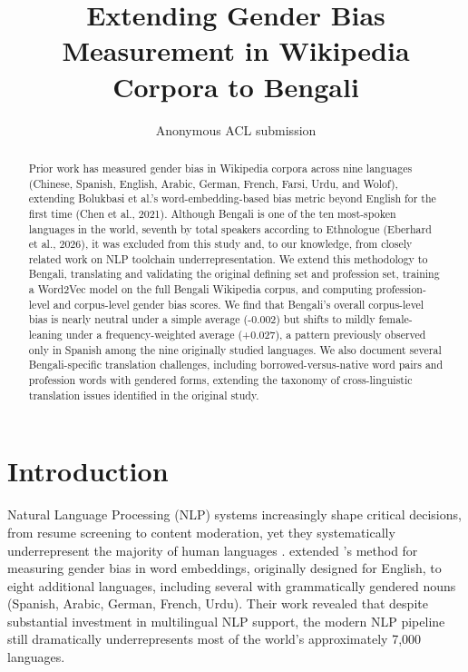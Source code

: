 \documentclass[11pt]{article}
\title{Extending Gender Bias Measurement in Wikipedia Corpora to Bengali}
\author{Anonymous ACL submission}
\begin{document}
\maketitle

\begin{abstract}
Prior work has measured gender bias in Wikipedia corpora across nine languages (Chinese, Spanish, English, Arabic, German, French, Farsi, Urdu, and Wolof), extending Bolukbasi et al.'s word-embedding-based bias metric beyond English for the first time (Chen et al., 2021). Although Bengali is one of the ten most-spoken languages in the world, seventh by total speakers according to Ethnologue (Eberhard et al., 2026), it was excluded from this study and, to our knowledge, from closely related work on NLP toolchain underrepresentation. We extend this methodology to Bengali, translating and validating the original defining set and profession set, training a Word2Vec model on the full Bengali Wikipedia corpus, and computing profession-level and corpus-level gender bias scores. We find that Bengali's overall corpus-level bias is nearly neutral under a simple average (-0.002) but shifts to mildly female-leaning under a frequency-weighted average (+0.027), a pattern previously observed only in Spanish among the nine originally studied languages. We also document several Bengali-specific translation challenges, including borrowed-versus-native word pairs and profession words with gendered forms, extending the taxonomy of cross-linguistic translation issues identified in the original study.
\end{abstract}

\section{Introduction}

Natural Language Processing (NLP) systems increasingly shape critical decisions, from resume screening to content moderation, yet they systematically underrepresent the majority of human languages \citep{wali2020machine,chen2021gender}. \citet{chen2021gender} extended \citet{bolukbasi2016man}'s method for measuring gender bias in word embeddings, originally designed for English, to eight additional languages, including several with grammatically gendered nouns (Spanish, Arabic, German, French, Urdu). Their work revealed that despite substantial investment in multilingual NLP support, the modern NLP pipeline still dramatically underrepresents most of the world's approximately 7,000 languages.
\end{document}
